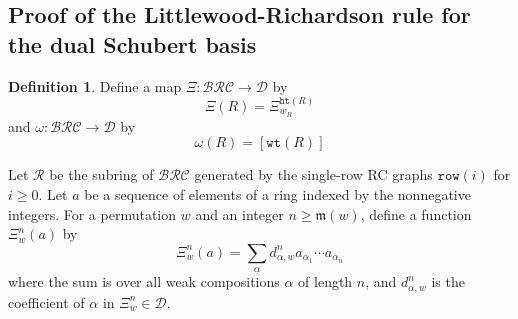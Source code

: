 \documentclass{amsart}
\makeatletter
\newcommand{\sqcupplus@inner}[2]{%
  \vcenter{\hbox{\ooalign{%
    \hfil$\m@th#1\sqcup$\hfil\cr
    \hfil\raisebox{0.15ex}{$\m@th#1\scriptscriptstyle+$}\hfil\cr
  }}}%
}
\newcommand{\sqcupplus}{\mathbin{\mathpalette\sqcupplus@inner\relax}}
\theoremstyle{definition}
\newtheorem{definition}[lemma]{Definition}
\theoremstyle{remark}
\numberwithin{equation}{subsection}
\newcommand{\wof}[1]{w_{#1}}
\newcommand{\wtt}{\mathtt{wt}}
\newcommand{\hr}{\mathtt{ht}}
\newcommand{\BRC}{\mathcal{BRC}}
\newcommand{\dsch}{\ensuremath{\Xi}}
\newcommand{\dcoma}{\mathcal{D}}
\newcommand{\maxd}{\mathfrak{m}}
\makeatother
\begin{document}
\subsection{Proof of the Littlewood-Richardson rule for the dual Schubert basis}


\begin{definition}
Define a map $\Xi:\BRC\to \dcoma$ by
$$\Xi(R) = \dsch_{\wof{R}}^{\hr(R)}$$
and $\omega:\BRC\to\dcoma$ by
$$\omega(R) = [\wtt(R)]$$

Let $\mathcal{R}$  be the subring of $\BRC$ generated by the single-row RC graphs $\mathtt{row}(i)$ for $i\geq 0$. Let $a$ be a sequence of elements of a ring indexed by the nonnegative integers. For a permutation $w$ and an integer $n\geq \maxd(w)$, define a function $\dsch_w^n(a)$ by
$$\dsch_w^n(a) = \sum_{\alpha} d_{\alpha, w}^n a_{\alpha_1} \cdots a_{\alpha_n}$$
where the sum is over all weak compositions $\alpha$ of length $n$, and $d_{\alpha, w}^n$ is the coefficient of $\alpha$ in $\dsch_w^n\in\dcoma$.
\end{definition}
\end{document}
